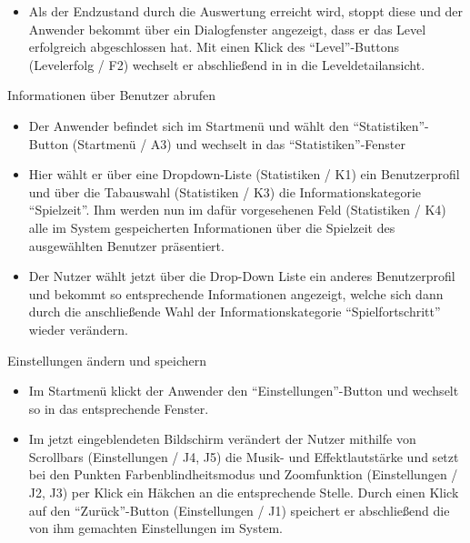 \begin{requirements}
\begin{itemize}
  			\item Als der Endzustand durch die Auswertung erreicht wird, stoppt diese und der Anwender bekommt über ein Dialogfenster angezeigt, dass er das Level erfolgreich abgeschlossen hat. Mit einen Klick des "`Level"'-Buttons (Levelerfolg / F2) wechselt er abschließend in in die Leveldetailansicht.
  			
  			
  	\end{itemize}
  			

  	
  	 Informationen über Benutzer abrufen
  	
  	
  	\begin{itemize}
  	
		\item Der Anwender befindet sich im Startmenü und wählt den "`Statistiken"'-Button (Startmenü / A3) und wechselt in das "`Statistiken"'-Fenster
		
		\item Hier wählt er über eine Dropdown-Liste (Statistiken / K1) ein Benutzerprofil und über die Tabauswahl (Statistiken / K3) die Informationskategorie "`Spielzeit"'. Ihm werden nun im dafür vorgesehenen Feld (Statistiken / K4) alle im System gespeicherten Informationen über die Spielzeit des ausgewählten Benutzer präsentiert.
		
		\item Der Nutzer wählt jetzt über die Drop-Down Liste ein anderes Benutzerprofil und bekommt so entsprechende Informationen angezeigt, welche sich dann durch die anschließende Wahl der Informationskategorie "`Spielfortschritt"' wieder verändern.
		
  	
  	\end{itemize}
  	
  	
  	
  	 Einstellungen ändern und speichern
  	
  	
  	\begin{itemize}
  	
		\item Im Startmenü klickt der Anwender den "`Einstellungen"'-Button und wechselt so in das entsprechende Fenster.
		
		\item Im jetzt eingeblendeten Bildschirm verändert der Nutzer mithilfe von Scrollbars (Einstellungen / J4, J5) die Musik- und Effektlautstärke und setzt bei den Punkten Farbenblindheitsmodus und Zoomfunktion (Einstellungen / J2, J3) per Klick ein Häkchen an die entsprechende Stelle. Durch einen Klick auf den "`Zurück"'-Button (Einstellungen / J1) speichert er abschließend die von ihm gemachten Einstellungen im System.
  	
  	\end{itemize}
  	
  	
\end{requirements}
  		
